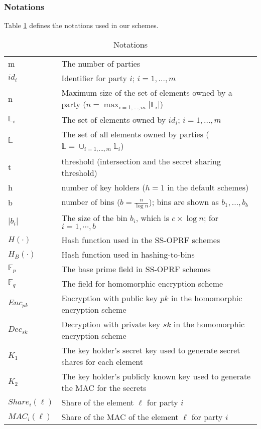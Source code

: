 \subsubsection{Notations} 
Table \ref{tab:Notations} defines the notations used in our schemes. 
\begin{table}[h!]
  \centering
  \caption{Notations}
  \label{tab:Notations}
  \begin{tabular}{ll}
    \toprule
     &  \\
    \midrule
    m & The number of parties \\
    $id_i$ &  Identifier for party $i$; $i = 1, \dots, m$\\
    n &  Maximum size of the set of elements owned by a party ($n = \max_{i = 1, \dots, m}{|\mathbb{L}_i|}$)\\
    $\mathbb{L}_i$ & The set of elements owned by $id_i$; $i = 1, \dots, m$\\
    $\mathbb{L}$ & The set of all elements owned by parties ($\mathbb{L} = \cup_{i = 1, \dots, m}{\mathbb{L}_i}$)\\
    t &  threshold (intersection and the secret sharing threshold)\\
    h & number of key holders ($h=1$ in the default schemes)\\
    b &  number of bins ($b = \frac{n}{\log{n}}$); bins are shown as $b_1, \dots, b_b$\\
    $|b_i|$ & The size of the bin $b_i$, which is $c \times \log{n}$; for $i=1, \cdots, b$\\
    $H(\cdot)$ & Hash function used in the SS-OPRF schemes\\
    $H_B(\cdot)$ & Hash function used in hashing-to-bins\\
    $\mathbb{F}_p$ & The base prime field in SS-OPRF schemes\\
    $\mathbb{F}_q$ & The field for homomorphic encryption scheme\\
    $Enc_{pk}$ &  Encryption with public key $pk$ in the homomorphic encryption scheme\\
    $Dec_{sk}$ &  Decryption with private key $sk$ in the homomorphic encryption scheme\\   
    $K_1$ & The key holder's secret key used to generate secret shares for each element\\
    $K_2$ & The key holder's publicly known key used to generate the MAC for the secrets \\
    $Share_i(\ell)$ & Share of the element $\ell$ for party $i$\\
    $MAC_i(\ell)$ & Share of the MAC of the element $\ell$ for party $i$\\
    \bottomrule
  \end{tabular}
\end{table}

